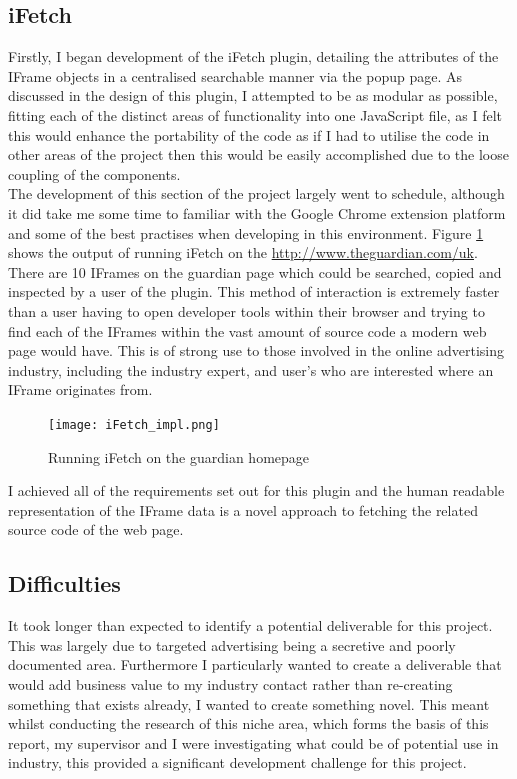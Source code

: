 \documentclass[12pt]{article}
\begin{document}
\subsection{iFetch}
Firstly, I began development of the iFetch plugin, detailing the attributes of the IFrame objects in a centralised searchable manner via the popup page. As discussed in the design of this plugin, I attempted to be as modular as possible, fitting each of the distinct areas of functionality into one JavaScript file, as I felt this would enhance the portability of the code as if I had to utilise the code in other areas of the project then this would be easily accomplished due to the loose coupling of the components. \\

The development of this section of the project largely went to schedule, although it did take me some time to familiar with the Google Chrome extension platform and some of the best practises when developing in this environment. Figure \ref{fig:iFetch_impl} shows the output of running iFetch on the \url{http://www.theguardian.com/uk}. There are 10 IFrames on the guardian page which could be searched, copied and inspected by a user of the plugin. This method of interaction is extremely faster than a user having to open developer tools within their browser and trying to find each of the IFrames within the vast amount of source code a modern web page would have. This is of strong use to those involved in the online advertising industry, including the industry expert, and user's who are interested where an IFrame originates from.     

\begin{figure}[H]
    \centering
    \texttt{[image: iFetch\_impl.png]}
    \caption{Running iFetch on the guardian homepage}
    \label{fig:iFetch_impl}
\end{figure}

I achieved all of the requirements set out for this plugin and the human readable representation of the IFrame data is a novel approach to fetching the related source code of the web page.

\subsection{Difficulties} \label{diff}
It took longer than expected to identify a potential deliverable for this project. This was largely  due to targeted advertising being a secretive and poorly documented area. Furthermore I particularly wanted to create a deliverable that would add business value to my industry contact rather than re-creating something that exists already, I wanted to create something novel. This meant whilst conducting the research of this niche area, which forms the basis of this report, my supervisor and I were investigating  what could be of potential use in industry, this provided a significant development challenge for this project. \\
\end{document}
